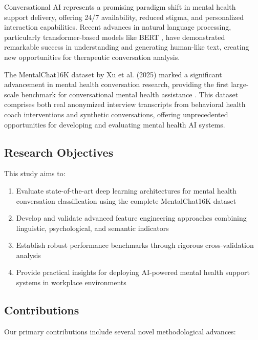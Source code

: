 \documentclass[11pt,twocolumn]{article}
\begin{document}
Conversational AI represents a promising paradigm shift in mental health support delivery, offering 24/7 availability, reduced stigma, and personalized interaction capabilities. Recent advances in natural language processing, particularly transformer-based models like BERT \cite{devlin2018bert}, have demonstrated remarkable success in understanding and generating human-like text, creating new opportunities for therapeutic conversation analysis.

The MentalChat16K dataset by Xu et al. (2025) marked a significant advancement in mental health conversation research, providing the first large-scale benchmark for conversational mental health assistance \cite{xu2025mentalchat16k}. This dataset comprises both real anonymized interview transcripts from behavioral health coach interventions and synthetic conversations, offering unprecedented opportunities for developing and evaluating mental health AI systems.

\subsection{Research Objectives}

This study aims to:

\begin{enumerate}
\item Evaluate state-of-the-art deep learning architectures for mental health conversation classification using the complete MentalChat16K dataset
\item Develop and validate advanced feature engineering approaches combining linguistic, psychological, and semantic indicators
\item Establish robust performance benchmarks through rigorous cross-validation analysis
\item Provide practical insights for deploying AI-powered mental health support systems in workplace environments
\end{enumerate}

\subsection{Contributions}

Our primary contributions include several novel methodological advances:
\end{document}
